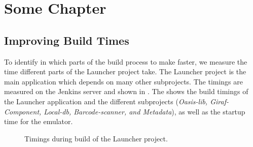 

\chapter{Some Chapter}
\section{Improving Build Times}

To identify in which parts of the build process to make faster, we measure the time different parts of the Launcher project take. The Launcher project is the main application which depends on many other subprojects. The timings are measured on the Jenkins server and shown in . The shows the build timings of the Launcher application and the different subprojects (\emph{Oasis-lib, Giraf-Component, Local-db, Barcode-scanner, and Metadata}), as well as the startup time for the emulator.

\begin{figure}
\caption{Timings during build of the Launcher project.}\label{fig:launcher_build_times}
\end{figure}

